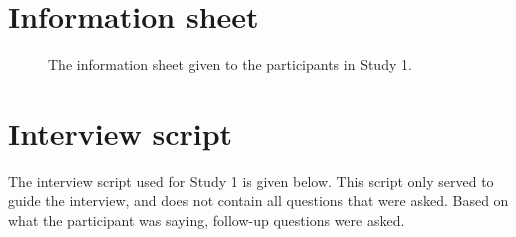 \section{Information sheet}\label{ch:information_sheet}
\begin{figure}[htp] 
\caption[Study 1 information sheet]{The information sheet given to the participants in Study 1.}
\label{fig:informationsheet}
\end{figure} 
\newpage

\section{Interview script}\label{ch:interviewscript}
The interview script used for Study 1 is given below. This script only served to guide the interview, and does not contain all questions that were asked. Based on what the participant was saying, follow-up questions were asked. 

